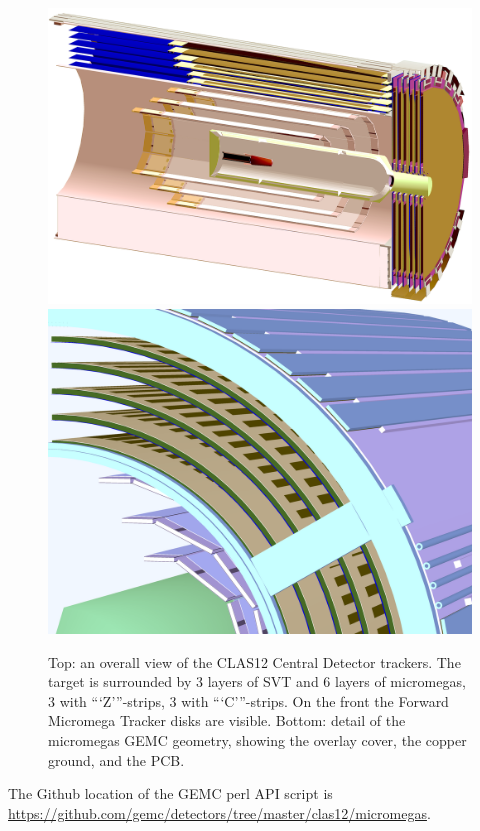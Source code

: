 \begin{figure}
	\centering
	\includegraphics[width=0.99\columnwidth,keepaspectratio]{img/bmtGeometry.png}
	\includegraphics[width=0.99\columnwidth,keepaspectratio]{img/bmtDetail.png}
	\caption{Top: an overall view of the CLAS12 Central Detector trackers. The target is surrounded by 3 layers of SVT and
            6 layers of micromegas, 3 with ```Z'''-strips, 3 with ```C'''-strips. On the front the Forward Micromega Tracker disks are visible.
            Bottom: detail of the micromegas GEMC geometry, showing the overlay cover, the copper ground, and the PCB.}
	\label{fig:bmtGeometry}
\end{figure}

The Github location of the GEMC perl API script is \url{https://github.com/gemc/detectors/tree/master/clas12/micromegas}.


